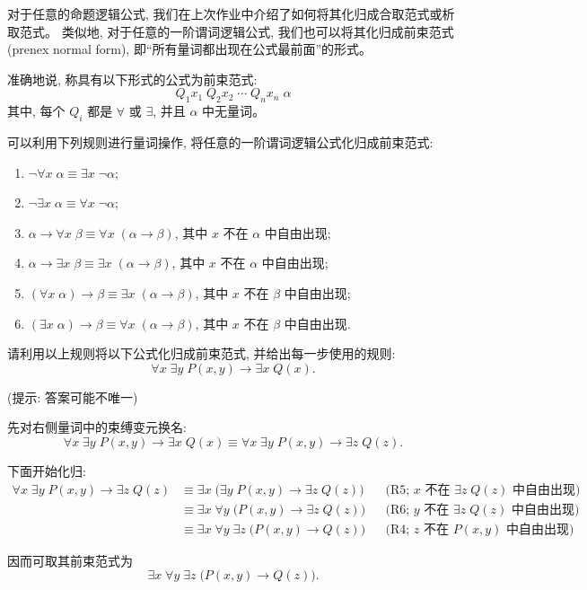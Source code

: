 \begin{problem}
  对于任意的命题逻辑公式,
  我们在上次作业中介绍了如何将其化归成合取范式或析取范式。
  类似地, 对于任意的一阶谓词逻辑公式,
  我们也可以将其化归成前束范式 (prenex normal form),
  即``所有量词都出现在公式最前面''的形式。

  准确地说, 称具有以下形式的公式为前束范式:
  \[
    Q_1 x_1\; Q_2 x_2\; \cdots\; Q_n x_n\; \alpha
  \]
  其中, 每个 $Q_i$ 都是 $\forall$ 或 $\exists$,
  并且 $\alpha$ 中无量词。

  可以利用下列规则进行量词操作, 将任意的一阶谓词逻辑公式化归成前束范式:
  \begin{enumerate}[label = \textbf{R\arabic*}]
    \item $\lnot \forall x\; \alpha \equiv \exists x\; \lnot \alpha$;
    \item $\lnot \exists x\; \alpha \equiv \forall x\; \lnot \alpha$;
    \item $\alpha \to \forall x\; \beta \equiv \forall x\; (\alpha \to \beta)$,
      其中 $x$ 不在 $\alpha$ 中自由出现;
    \item $\alpha \to \exists x\; \beta \equiv \exists x\; (\alpha \to \beta)$,
      其中 $x$ 不在 $\alpha$ 中自由出现;
    \item $(\forall x\; \alpha) \to \beta \equiv \exists x\; (\alpha \to \beta)$,
      其中 $x$ 不在 $\beta$ 中自由出现;
    \item $(\exists x\; \alpha) \to \beta \equiv \forall x\; (\alpha \to \beta)$,
      其中 $x$ 不在 $\beta$ 中自由出现.
  \end{enumerate}

  请利用以上规则将以下公式化归成前束范式,
  并给出每一步使用的规则:
  \[
    \forall x\; \exists y\; P(x, y) \to \exists x\; Q(x).
  \]

  (提示: 答案可能不唯一)
\end{problem}

\begin{solution}
  先对右侧量词中的束缚变元换名:
  \[
    \forall x\; \exists y\; P(x, y) \to \exists x\; Q(x)
    \equiv
    \forall x\; \exists y\; P(x, y) \to \exists z\; Q(z).
  \]

  下面开始化归:
  \begin{align*}
    \forall x\; \exists y\; P(x, y) \to \exists z\; Q(z)
      &\equiv \exists x\; \big(\exists y\; P(x, y) \to \exists z\; Q(z)\big)
        && \text{(R5; $x$ 不在 $\exists z\; Q(z)$ 中自由出现)} \\
      &\equiv \exists x\; \forall y\; \big(P(x, y) \to \exists z\; Q(z)\big)
        && \text{(R6; $y$ 不在 $\exists z\; Q(z)$ 中自由出现)} \\
      &\equiv \exists x\; \forall y\; \exists z\; \big(P(x, y) \to Q(z)\big)
        && \text{(R4; $z$ 不在 $P(x, y)$ 中自由出现)}.
  \end{align*}

  因而可取其前束范式为
  \[
    \boxed{\exists x\; \forall y\; \exists z\; \big(P(x, y) \to Q(z)\big)}.
  \]
\end{solution}
